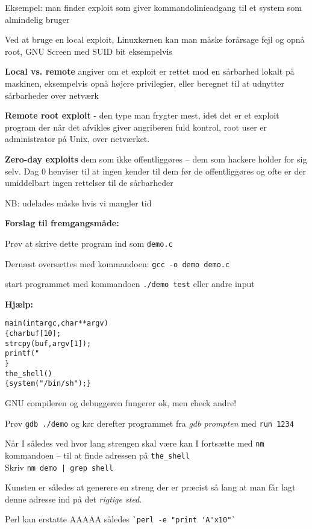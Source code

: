 \documentclass[20pt,landscape,a4paper,footrule]{foils}
\begin{document}
Eksempel: man finder exploit som giver kommandolinieadgang til et system
som almindelig bruger

Ved at bruge en local exploit, Linuxkernen kan man måske forårsage fejl
og opnå root, GNU Screen med SUID bit eksempelvis



\begin{list1}
\item {\bfseries Local vs. remote}
angiver om et exploit er rettet mod
en sårbarhed lokalt på maskinen, eksempelvis
opnå højere privilegier, eller beregnet
til at udnytter sårbarheder over netværk
\item {\bfseries Remote root exploit}
- den type man frygter mest, idet
det er et exploit program der når det afvikles giver
angriberen fuld kontrol, root user er administrator
på Unix, over netværket.
\item {\bfseries Zero-day exploits} dem som ikke offentliggøres -- dem
  som hackere holder for sig selv. Dag 0 henviser til at ingen kender
  til dem før de offentliggøres og ofte er der umiddelbart ingen
  rettelser til de sårbarheder
\end{list1}





NB: udelades måske hvis vi mangler tid

{\bfseries Forslag til fremgangsmåde:}
\begin{list2}
\item Prøv at skrive dette program ind som \verb+demo.c+
\item Dernæst oversættes med kommandoen:
\verb+gcc -o demo demo.c+
\item start programmet med kommandoen
\verb+./demo test+ eller andre input
\end{list2}

{\bfseries Hjælp:}
\begin{alltt}
main(int argc, char **argv)
\{      char buf[10];
        strcpy(buf, argv[1]);
        printf("%s\textbackslash{}n",buf);
\}
the_shell()
\{  system("/bin/sh");  \}
\end{alltt}



\begin{list1}
\item GNU compileren og debuggeren fungerer ok, men check andre!
\item Prøv \verb+gdb ./demo+ og kør derefter programmet fra \emph{gdb prompten}
med  \verb+run 1234+
\item Når I således ved hvor lang strengen skal være kan I fortsætte
  med \verb+nm+ kommandoen -- til at finde adressen på
  \verb+the_shell+\\
Skriv \verb+nm demo | grep shell+

\item Kunsten er således at generere en streng der er præcist så lang
  at man får lagt denne adresse ind på det \emph{rigtige sted}.
\item Perl kan erstatte AAAAA således \verb+`perl -e "print 'A'x10"`+
\end{list1}
\end{document}
